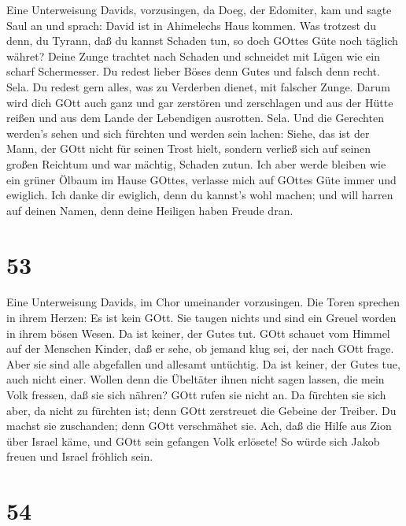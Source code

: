  Eine Unterweisung Davids, vorzusingen,  da
Doeg, der Edomiter, kam und sagte Saul an und sprach: David ist in
Ahimelechs Haus kommen.  Was trotzest du denn, du Tyrann,
daß du kannst Schaden tun, so doch GOttes Güte noch täglich währet?
 Deine Zunge trachtet nach Schaden und schneidet mit Lügen
wie ein scharf Schermesser.  Du redest lieber Böses denn
Gutes und falsch denn recht. Sela.  Du redest gern alles,
was zu Verderben dienet, mit falscher Zunge.  Darum wird
dich GOtt auch ganz und gar zerstören und zerschlagen und aus der Hütte
reißen und aus dem Lande der Lebendigen ausrotten. Sela. 
Und die Gerechten werden's sehen und sich fürchten und werden sein
lachen:  Siehe, das ist der Mann, der GOtt nicht für seinen
Trost hielt, sondern verließ sich auf seinen großen Reichtum und war
mächtig, Schaden zutun.  Ich aber werde bleiben wie ein
grüner Ölbaum im Hause GOttes, verlasse mich auf GOttes Güte immer und
ewiglich.  Ich danke dir ewiglich, denn du kannst's wohl
machen; und will harren auf deinen Namen, denn deine Heiligen haben
Freude dran.

\hypertarget{section-52}{%
\section{53}\label{section-52}}

 Eine Unterweisung Davids, im Chor umeinander vorzusingen.
 Die Toren sprechen in ihrem Herzen: Es ist kein GOtt. Sie
taugen nichts und sind ein Greuel worden in ihrem bösen Wesen. Da ist
keiner, der Gutes tut.  GOtt schauet vom Himmel auf der
Menschen Kinder, daß er sehe, ob jemand klug sei, der nach GOtt frage.
 Aber sie sind alle abgefallen und allesamt untüchtig. Da
ist keiner, der Gutes tue, auch nicht einer.  Wollen denn
die Übeltäter ihnen nicht sagen lassen, die mein Volk fressen, daß sie
sich nähren? GOtt rufen sie nicht an.  Da fürchten sie sich
aber, da nicht zu fürchten ist; denn GOtt zerstreuet die Gebeine der
Treiber. Du machst sie zuschanden; denn GOtt verschmähet sie.
 Ach, daß die Hilfe aus Zion über Israel käme, und GOtt sein
gefangen Volk erlösete! So würde sich Jakob freuen und Israel fröhlich
sein.

\hypertarget{section-53}{%
\section{54}\label{section-53}}

